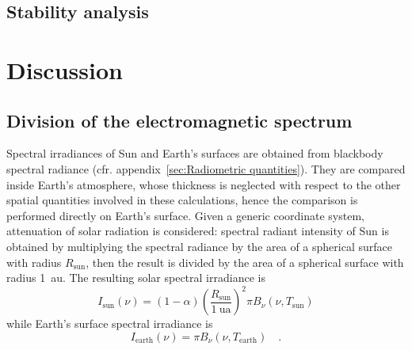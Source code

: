 \documentclass[a4paper,10pt,final,twocolumn]{article}
\begin{document}
\subsection{Stability analysis}

\section{Discussion}

\subsection{Division of the electromagnetic spectrum}
\label{sec:Division of the electromagnetic spectrum}
Spectral irradiances of Sun and Earth's surfaces are obtained from blackbody spectral radiance (cfr. appendix~\ref{sec:Radiometric quantities}). They are compared inside Earth's atmosphere, whose thickness is neglected with respect to the other spatial quantities involved in these calculations, hence the comparison is performed directly on Earth's surface. Given a generic coordinate system, attenuation of solar radiation is considered: spectral radiant intensity of Sun is obtained by multiplying the spectral radiance by the area of a spherical surface with radius $R_\text{sun}$, then the result is divided by the area of a spherical surface with radius \qty{1}{\astronomicalunit}. The resulting solar spectral irradiance is
\begin{equation}
  \label{eq:spectral_irradiance_sun}
  I_\text{sun}(\nu) = (1 - \alpha) \left( \frac{R_\text{sun}}{\qty{1}{\astronomicalunit}} \right)^2 \pi B_\nu(\nu, T_\text{sun})
\end{equation}
while Earth's surface spectral irradiance is
\begin{equation}
  \label{eq:spectral_irradiance_earth}
  I_\text{earth}(\nu) = \pi B_\nu(\nu, T_\text{earth})
  \quad .
\end{equation}
\end{document}
